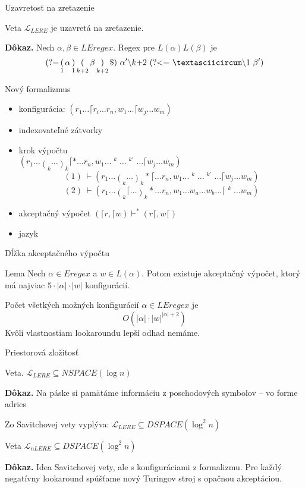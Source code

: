 \documentclass[mathserif]{beamer}
\def\e{Eregex}
\def\le{LEregex}
\def\lel{\mathscr{L}_{LERE}}
\def\nlel{\mathscr{L}_{nLERE}}
\def\lookahead{\text{(?=}}
\def\lookbehind{\text{(?\textless =}}
\begin{document}
\begin{frame}{Uzavretosť na zreťazenie}
\begin{block}{Veta}
$\lel$ je uzavretá na zreťazenie.
\end{block}
\textbf{Dôkaz.} Nech $\alpha,\beta\in\le$. Regex pre $L(\alpha)L(\beta)$ je
$$
 \lookahead \mathop(_1 \alpha \mathop)_1 \mathop(_{k+2}\beta \mathop)_{k+2} \mathdollar) ~\alpha ' \backslash k\text{+2}~ \lookbehind ~\textasciicircum\backslash 1~\beta ')
$$
\end{frame}

\begin{frame}{Nový formalizmus}
\begin{itemize}
\item konfigurácia: $(r_1\dots \lceil r_i\dots r_n,w_1 \dots \lceil w_j \dots w_m)$
\item indexovateľné zátvorky
\item krok výpočtu 
\\ \vspace{5pt} $\displaystyle{(r_1 \dots \mathop{(}_k \dots \mathop{)}_k\lceil * \dots r_n, w_1 \dots \mathop{w_a}^k \dots \mathop{w_b}^{k'} \dots \lceil w_j \dots w_m)}$
$$(1) ~\vdash(r_1 \dots \mathop{(}_k \dots \mathop{)}_k *\lceil \dots r_n, w_1 \dots \mathop{w_a}^k \dots \mathop{w_b}^{k'} \dots \lceil w_j \dots w_m)$$
$$(2) ~\vdash(r_1 \dots \mathop{(}_k\lceil \dots \mathop{)}_k * \dots r_n, w_1 \dots w_a \dots w_b \dots \lceil \mathop{w_j}^k \dots w_m)$$
\item akceptačný výpočet $(\lceil r, \lceil w)\vdash^* (r \lceil, w \lceil)$
\item jazyk
\end{itemize}
\end{frame}

\begin{frame}{Dĺžka akceptačného výpočtu}
\begin{block}{Lema}
Nech $\alpha \in \e$ a $w \in L(\alpha)$. Potom existuje akceptačný výpočet, ktorý má najviac $5\cdot|\alpha|\cdot|w|$ konfigurácií.
\end{block}

\vspace{20pt}
Počet všetkých možných konfigurácií $\alpha\in\le$ je $$O(|\alpha|\cdot|w|^{|\alpha|+2})$$
Kvôli vlastnostiam lookaroundu lepší odhad nemáme.
\end{frame}

\begin{frame}{Priestorová zložitosť}
\begin{block}{Veta.}
$\lel \subseteq NSPACE(\log n)$
\end{block}
\textbf{Dôkaz.} Na páske si pamätáme informáciu z poschodových symbolov -- vo forme adries

\vspace{10pt}
Zo Savitchovej vety vyplýva: $\lel \subseteq DSPACE(\log^2 n)$
\begin{block}{Veta}
$\nlel \subseteq DSPACE(\log^2 n)$
\end{block}
\textbf{Dôkaz.} Idea Savitchovej vety, ale s konfiguráciami z formalizmu. Pre každý negatívny lookaround spúšťame nový Turingov stroj s opačnou akceptáciou.
\end{frame}
\end{document}

